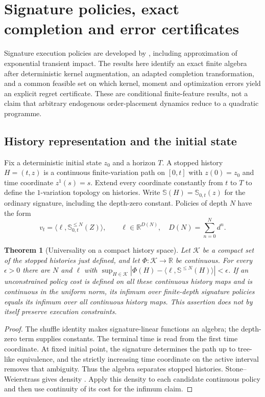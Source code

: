 \documentclass[11pt]{article}
\numberwithin{equation}{section}
\newtheorem{theorem}{Theorem}[section]
\theoremstyle{definition}
\theoremstyle{remark}
\newcommand{\R}{\mathbb{R}}
\theoremstyle{definition}
\begin{document}
\section{Signature policies, exact completion and error certificates}\label{sec:signature}

Signature execution policies are developed by \citet{kalsi2020}, including
approximation of exponential transient impact. The results here identify an
exact finite algebra after deterministic kernel augmentation, an adapted
completion transformation, and a common feasible set on which kernel,
moment and optimization errors yield an explicit regret certificate. These
are conditional finite-feature results, not a claim that arbitrary endogenous
order-placement dynamics reduce to a quadratic programme.

\subsection{History representation and the initial state}
Fix a deterministic initial state $z_0$ and a horizon $T$. A stopped history
$H=(t,z)$ is a continuous finite-variation path on $[0,t]$ with $z(0)=z_0$
and time coordinate $z^1(s)=s$. Extend every coordinate constantly from $t$ to
$T$ to define the $1$-variation topology on histories. Write
$\mathbb S(H)=\mathbb S_{0,t}(z)$ for the ordinary signature, including the
depth-zero constant. Policies of depth $N$ have the form
\begin{equation}\label{eq:sigpolicy}
 v_t=\langle\ell,\mathbb S^{\le N}_{0,t}(Z)\rangle,
 \qquad \ell\in\R^{D(N)},\quad D(N)=\sum_{n=0}^Nd^n.
\end{equation}

\begin{theorem}[Universality on a compact history space]\label{thm:siguniversal}
Let $\mathcal K$ be a compact set of the stopped histories just defined, and
let $\Phi:\mathcal K\to\R$ be continuous. For every $\epsilon>0$ there are
$N$ and $\ell$ with
$\sup_{H\in\mathcal K}|\Phi(H)-\langle\ell,\mathbb S^{\le N}(H)\rangle|
<\epsilon$. If an unconstrained policy cost is defined on all these
continuous history maps and is continuous in the uniform norm, its infimum
over finite-depth signature policies equals its infimum over all continuous
history maps. This assertion does not by itself preserve execution constraints.
\end{theorem}
\begin{proof}
The shuffle identity makes signature-linear functions an algebra; the
depth-zero term supplies constants. The terminal time is read from the first
time coordinate. At fixed initial point, the signature determines the path up
to tree-like equivalence, and the strictly increasing time coordinate on the
active interval removes that ambiguity. Thus the algebra separates stopped
histories. Stone--Weierstrass gives density
\citep{hamblylyons2010,levin2013,kalsi2020}. Apply this density to each candidate
continuous policy and then use continuity of its cost for the infimum claim.
\end{proof}
\end{document}
